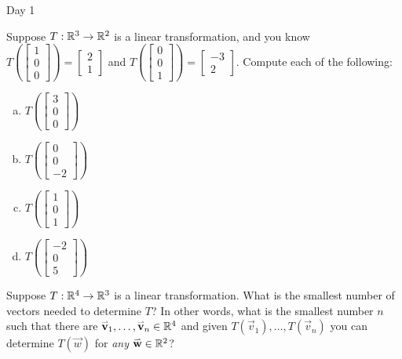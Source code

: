 \begin{applicationActivities}{Day 1}
\begin{activity}{0}
Suppose $T: \mathbb{R}^3 \rightarrow \mathbb{R}^2$ is a linear transformation, and you know $T\left(\begin{bmatrix} 1 \\ 0 \\ 0 \end{bmatrix} \right) = \begin{bmatrix} 2 \\ 1 \end{bmatrix} $ and $T\left(\begin{bmatrix} 0 \\ 0 \\ 1 \end{bmatrix} \right) = \begin{bmatrix} -3 \\ 2 \end{bmatrix} $.  Compute each of the following:
\begin{enumerate}[(a)]
\item $T\left(\begin{bmatrix} 3 \\ 0 \\ 0 \end{bmatrix}\right)$
\item $T\left(\begin{bmatrix} 0 \\ 0 \\ -2 \end{bmatrix}\right)$
\item $T\left(\begin{bmatrix} 1 \\ 0 \\ 1 \end{bmatrix}\right)$
\item $T\left(\begin{bmatrix} -2 \\ 0 \\ 5 \end{bmatrix}\right)$
\end{enumerate}
\end{activity}

\begin{activity}{0}
Suppose $T: \mathbb{R}^4 \rightarrow \mathbb{R}^3$ is a linear transformation.  What is the smallest number of vectors needed to determine $T$?  In other words, what is the smallest number $n$ such that there are $\mathbf{\accentset{\rightharpoonup}{v}}_1,\ldots,\mathbf{\accentset{\rightharpoonup}{v}}_n \in \mathbb{R}^4$ and given  $T(\vec{v}_1), \ldots, T(\vec{v}_n)$ you can determine $T(\vec{w})$ for \textit{any} $\mathbf{\accentset{\rightharpoonup}{w}} \in \mathbb{R}^2$?
\end{activity}


\end{applicationActivities}
